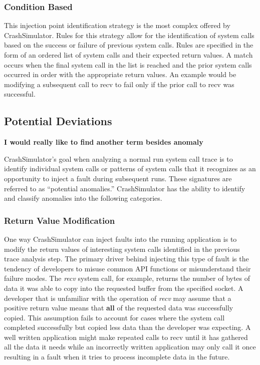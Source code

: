         \subsubsection{Condition Based}

            This injection point identification strategy is the most complex offered by CrashSimulator. Rules for this
            strategy allow for the identification of system calls based on the success or failure of previous system
            calls.  Rules are specified in the form of an ordered list of system calls and their expected return values.
            A match occurs when the final system call in the list is reached and the prior system calls occurred in
            order with the appropriate return values. An example would be modifying a subsequent call to recv to fail
            only if the prior call to recv was successful.

    \subsection{Potential Deviations}

        \textbf{I would really like to find another term besides anomaly}

        CrashSimulator's goal when analyzing a normal run system call trace is to identify individual system calls or
        patterns of system calls that it recognizes as an opportunity to inject a fault during subsequent runs. These
        signatures are referred to as ``potential anomalies.'' CrashSimulator has the ability to identify and classify
        anomalies into the following categories.

        \subsubsection{Return Value Modification}

            One way CrashSimulator can inject faults into the running application is to modify the return values of
            interesting system calls identified in the previous trace analysis step. The primary driver behind injecting
            this type of fault is the tendency of developers to misuse common API functions or misunderstand their
            failure modes. The \emph{recv} system call, for example, returns the number of bytes of data it was able to
            copy into the requested buffer from the specified socket. A developer that is unfamiliar with the operation
            of \emph{recv} may assume that a positive return value means that \textbf{all} of the requested data was
            successfully copied. This assumption fails to account for cases where the system call completed successfully
            but copied less data than the developer was expecting. A well written application might make repeated calls
            to recv until it has gathered all the data it needs while an incorrectly written application may only call
            it once resulting in a fault when it tries to process incomplete data in the future.

